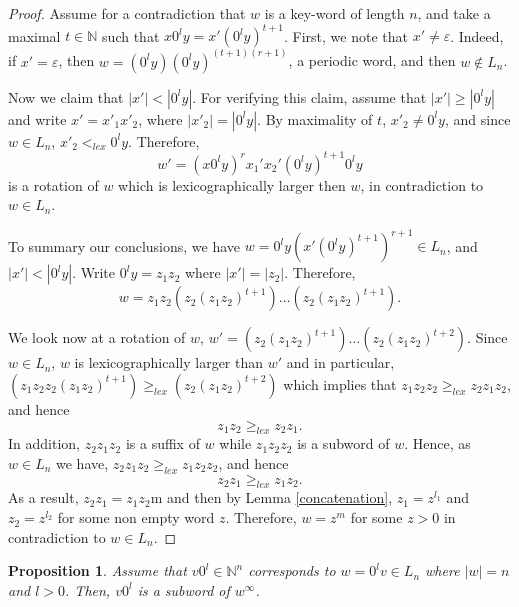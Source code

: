 \documentclass{article}
\newtheorem{proposition}[theorem]{Proposition}
\theoremstyle{definition}
\newcommand{\N}{{\mathbb{N}}}
\begin{document}
\begin{proof}
	Assume for a contradiction that $w$ is a key-word of length $n$, and take a maximal $t\in \N$ such that $x0^ly=x'(0^ly)^{t+1}$. First, we note that $x'\neq \varepsilon$. Indeed, if $x'=\varepsilon$, then $w=(0^ly)(0^ly)^{(t+1)(r+1)}$, a periodic word, and then $w\notin L_n$.
	
	Now we claim that $|x'|<|0^ly|$. For verifying this claim, assume that $|x'|\geq |0^ly|$ and write $x'=x'_1x'_2$, where $|x'_2|=|0^ly|$. By maximality of $t$, $x'_2\neq 0^ly$, and since $w\in L_n$, $x'_2<_{lex} 0^ly$. Therefore, $$w'=(x0^ly)^rx_1'x_2'(0^ly)^{t+1}0^ly$$ is a rotation of $w$ which is lexicographically larger then $w$, in contradiction to $w\in L_n$.
	
	To summary our conclusions, we have $w=0^ly(x'(0^ly)^{t+1})^{r+1}\in L_n$, and $|x'|<|0^ly|$. Write $0^ly=z_1z_2$ where $|x'|=|z_2|$. Therefore, $$w=z_1z_2(z_2(z_1z_2)^{t+1})\dots(z_2(z_1z_2)^{t+1}).$$ 
	
	We look now at a rotation of $w$, $w'=(z_2(z_1z_2)^{t+1})\dots(z_2(z_1z_2)^{t+2})$. Since $w\in L_n$, $w$ is lexicographically larger than $w'$ and in particular,
	$(z_1z_2z_2(z_1z_2)^{t+1})\geq_{lex}(z_2(z_1z_2)^{t+2})$ which implies that
	$z_1z_2z_2\geq_{lex}z_2z_1z_2$, and hence
	$$z_1z_2\geq_{lex}z_2z_1.$$
	In addition, $z_2z_1z_2$ is a suffix of $w$ while $z_1z_2z_2$ is a subword of $w$. Hence, as $w\in L_n$ we have, $z_2z_1z_2\geq_{lex} z_1z_2z_2$, and hence
	$$z_2z_1\geq_{lex}z_1z_2.$$
	As a result, $z_2z_1=z_1z_2$m and then by Lemma \ref{concatenation}, $z_1=z^{l_1}$ and $z_2=z^{l_2}$ for some non empty word $z$. Therefore, $w=z^m$ for some $z>0$ in contradiction to $w\in L_n$. 
	
	
\end{proof}

\begin{proposition}
	Assume that $v0^l\in\mathbb{N}^n$ corresponds to $w=0^lv\in L_n$ where $|w|=n$ and $l>0$. Then, $v0^l$ is a subword of $w^\infty$. 
\end{proposition}
\end{document}
